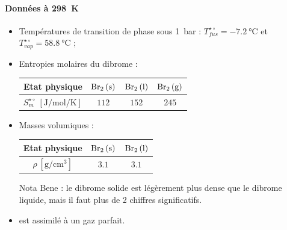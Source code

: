 \paragraph*{Données à \SI{298}{\kelvin}}
\begin{itemize}
\item Températures de transition de phase sous \SI{1}{\bar} : $T_{fus}^{\star \circ} = -7.2 ~ \si{\celsius}$ et $T_{vap}^{\star \circ} = 58.8 ~ \si{\celsius}$ ;
\item Entropies molaires du dibrome  :
\begin{center}
\begin{tabular}{cccc}
\toprule
Etat physique & $\ce{Br2 (s)}$ & $\ce{Br2 (l)}$ & $\ce{Br2 (g)}$ \\
\midrule
$S_m^{\star \circ} ~ [\si{\joule\per\mole\per\kelvin}]$ & $112$ & $152$ & $245$\\
\bottomrule
\end{tabular}
\end{center}
\item Masses volumiques : 
\begin{center}
\begin{tabular}{ccc}
\toprule
Etat physique & $\ce{Br2 (s)}$ & $\ce{Br2 (l)}$ \\
\midrule
$\rho ~ [\si{\gram\per\centi\meter\cubed}]$ & $3.1$ & $3.1$\\
\bottomrule
\end{tabular}
\end{center}

Nota Bene : le dibrome solide est légèrement plus dense que le dibrome liquide, mais il faut plus de 2 chiffres significatifs.

\item {} est assimilé à un gaz parfait.
\end{itemize}